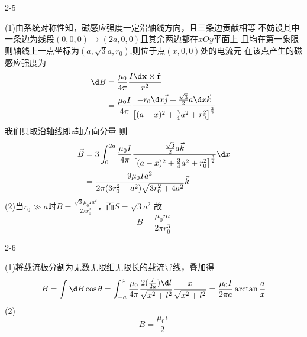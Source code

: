 \documentclass{phyasgn}
\begin{document}
{\heiti\color{red} 2-5}
\begin{sol}
    (1)由系统对称性知，磁感应强度一定沿轴线方向，且三条边贡献相等
    不妨设其中一条边为线段$(0,0,0)\to  (2a,0,0)$且其余两边都在$xOy$平面上
    且均在第一象限则轴线上一点坐标为$(a,\sqrt{3}a,r_0)$,则位于点$(x,0,0)$处的电流元
    在该点产生的磁感应强度为
    $$\begin{aligned}
        \d B&=\frac{\mu_0}{4\pi}\frac{I\d \mathbf{x}\times \hat{\mathbf{r}}}{r^2}\\
        &=\frac{\mu_0I}{4\pi}\frac{-r_0\d x\vec{j}+\frac{\sqrt{3}}{2}a\d x\vec{k}}{\left [ (a-x)^2+\frac{3}{4}a^2+r_0^2  \right ] ^\frac{3}{2}}
    \end{aligned}$$
    我们只取沿轴线即$z$轴方向分量
    则
    $$\begin{aligned}
        \vec{B}&=3\int_0^{2a}\frac{\mu_0I}{4\pi}\frac{\frac{\sqrt{3}}{2}a\vec{k}}{\left [ (a-x)^2+\frac{3}{4}a^2+r_0^2  \right ] ^\frac{3}{2}}\d x\\
        &=\frac{9\mu_0Ia^2}{2\pi(3r_0^2+a^2)\sqrt{3r_0^2+4a^2}}\vec{k}
    \end{aligned}$$
    (2)当$r_0\gg a$时$B=\frac{\sqrt{3}\mu_0Ia^2}{2\pi r_0^3}$，而$S=\sqrt{3}a^2$
    故
    $$B=\frac{\mu_0m}{2\pi r_0^3}$$
\end{sol}\par

{\heiti\color{red} 2-6}
\begin{sol}
    (1)将载流板分割为无数无限细无限长的载流导线，叠加得
    $$B=\int \d B\cos\theta=\int_{-a}^a\frac{\mu_0}{4\pi}\frac{2(\frac{I}{2a})\d l}{\sqrt{x^2+l^2}}\frac{x}{\sqrt{x^2+l^2}}=\frac{\mu_0I}{2\pi a}\arctan\frac{a}{x}$$
    (2)$$B=\frac{\mu_0\iota }{2}$$
\end{sol}\par
\end{document}
